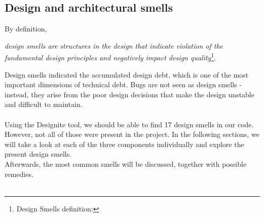     \subsection{Design and architectural smells}
        By definition, 
        \begin{adjustwidth}{1.5cm}{}
            \textit{design smells are structures in the design that indicate violation of the fundamental design principles and negatively impact design quality}\footnote{Design Smells definition: }.
        \end{adjustwidth}
        Design smells indicated the accumulated design debt, which is one of the most important dimensions of technical debt. Bugs are not seen as design smells - instead, they arise from the poor design decisions that make the design unstable and difficult to maintain.\\\\
        Using the Designite tool, we should be able to find 17 design smells in our code. However, not all of those were present in the project. In the following sections, we will take a look at each of the three components individually and explore the present design smells. \\
        Afterwards, the most common smells will be discussed, together with possible remedies.\\\\
        
